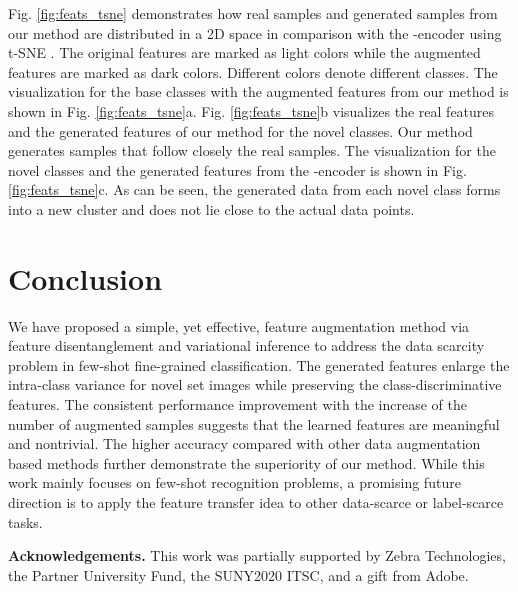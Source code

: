 \documentclass[10pt,twocolumn,letterpaper]{article}
\begin{document}
Fig. \ref{fig:feats_tsne} demonstrates how real samples and generated samples from our method are distributed in a 2D space in comparison with the -encoder \cite{delta-encoder} using t-SNE \cite{Maaten2008VisualizingDU}. The original features are marked as light colors while the augmented features are marked as dark colors. Different colors denote different classes. The visualization for the base classes with the augmented features from our method is shown in Fig. \ref{fig:feats_tsne}a. Fig. \ref{fig:feats_tsne}b visualizes the real features and the generated features of our method for the novel classes. Our method generates samples that follow closely the real samples. The visualization for the novel classes and the generated features from the -encoder is shown in Fig. \ref{fig:feats_tsne}c. As can be seen, the generated data from each novel class forms into a new cluster and does not lie close to the  actual data points. 



\section{Conclusion} 
   We have proposed a simple, yet effective, feature augmentation method via feature disentanglement and variational inference  to address the data scarcity problem in few-shot fine-grained classification.
The generated features enlarge the intra-class variance for novel set images while preserving the class-discriminative features.
The consistent performance improvement with the increase of the number of augmented samples suggests that the learned features are meaningful and nontrivial.
The higher accuracy compared with other data augmentation based methods further demonstrate the superiority of our method.
While this work mainly focuses on few-shot recognition problems, a promising future direction is to apply the feature transfer idea to other data-scarce or label-scarce tasks.
     
\newcommand{\myheading}[1]{\vspace{1ex}\noindent \textbf{#1}}
\myheading{Acknowledgements.} 
This work was partially supported by Zebra Technologies, the Partner University Fund, the SUNY2020 ITSC, and a gift from Adobe. 

{\small


}
\end{document}
